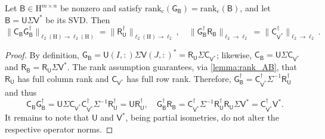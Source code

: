 \documentclass[onefignum,onetabnum]{siamart250211}
\renewenvironment{equation*}{\[}{\]\ignorespacesafterend}
\newcommand{\Hilb}{\mathrm{H}}
\newcommand{\Batrix}[1]{\bm{\Matrix{#1}}}
\newcommand{\Matrix}[1]{\mathsf{#1}}
\newcommand{\pinv}{\dagger}
\newcommand{\Rank}[3][]{\mathrm{rank_{#2}} #1( #3 #1)}
\newcommand{\Index}[1]{{#1}}
\newcommand{\Norm}[3][]{#1\| #2 #1\|_{\mathrm{#3}}}
\begin{document}
\begin{lemma}
\label{lemma:sub_pinv}
Let $\Batrix{B} \in \Hilb^{m \times n}$ be nonzero and satisfy $\Rank{c}{\Batrix{G}_{\Batrix{B}}} = \Rank{c}{\Batrix{B}}$, and let $\Batrix{B} = \Batrix{U} \Matrix{\Sigma} \Matrix{V}^\ast$ be its SVD.
Then
\begin{equation*}
    \Norm{\Batrix{C}_{\Batrix{B}} \Batrix{G}_{\Batrix{B}}^\pinv}{\ell_2(\Hilb) \to \ell_2(\Hilb)} = \Norm{\Batrix{R}_{\Batrix{U}}^\pinv}{\ell_2(\Hilb) \to \ell_2}, \quad \Norm{\Batrix{G}_{\Batrix{B}}^\pinv \Batrix{R}_{\Batrix{B}}}{\ell_2 \to \ell_2} = \Norm{\Matrix{C}_{\Matrix{V}^\ast}^\pinv}{\ell_2 \to \ell_2}.
\end{equation*}
\end{lemma}
\begin{proof}
By definition, $\Batrix{G}_{\Batrix{B}} = \Batrix{U}(\Index{I}, :) \Matrix{\Sigma} \Matrix{V}(\Index{J}, :)^\ast = \Batrix{R}_{\Batrix{U}} \Matrix{\Sigma} \Matrix{C}_{\Matrix{V}^\ast}$; likewise, $\Batrix{C}_{\Batrix{B}} = \Batrix{U} \Matrix{\Sigma} \Matrix{C}_{\Matrix{V}^\ast}$ and $\Batrix{R}_{\Batrix{B}} = \Batrix{R}_{\Batrix{U}} \Matrix{\Sigma} \Matrix{V}^\ast$.
The rank assumption guarantees, via \cref{lemma:rank_AB}, that $\Batrix{R}_{\Batrix{U}}$ has full column rank and $\Matrix{C}_{\Matrix{V}^\ast}$ has full row rank.
Therefore, $\Batrix{G}_{\Batrix{B}}^\pinv = \Matrix{C}_{\Matrix{V}^\ast}^\pinv \Matrix{\Sigma}^{-1} \Batrix{R}_{\Batrix{U}}^\pinv$ and thus
\begin{equation*}
    \Batrix{C}_{\Batrix{B}} \Batrix{G}_{\Batrix{B}}^\pinv = \Batrix{U} \Matrix{\Sigma} \Matrix{C}_{\Matrix{V}^\ast} \Matrix{C}_{\Matrix{V}^\ast}^\pinv \Matrix{\Sigma}^{-1} \Batrix{R}_{\Batrix{U}}^\pinv = \Batrix{U} \Batrix{R}_{\Batrix{U}}^\pinv, \quad \Batrix{G}_{\Batrix{B}}^\pinv \Batrix{R}_{\Batrix{B}} = \Matrix{C}_{\Matrix{V}^\ast}^\pinv \Matrix{\Sigma}^{-1} \Batrix{R}_{\Batrix{U}}^\pinv \Batrix{R}_{\Batrix{U}} \Matrix{\Sigma} \Matrix{V}^\ast = \Matrix{C}_{\Matrix{V}^\ast}^\pinv \Matrix{V}^\ast.
\end{equation*}
It remains to note that $\Batrix{U}$ and $\Matrix{V}^\ast$, being partial isometries, do not alter the respective operator norms.
\end{proof}
\end{document}
